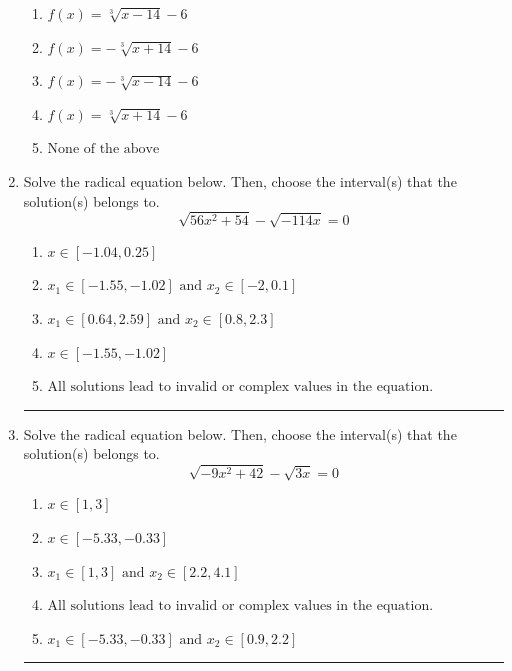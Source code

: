 \documentclass[14pt]{extbook}
\newcommand{\litem}[1]{\item#1\hspace*{-1cm}\rule{\textwidth}{0.4pt}}
\begin{document}
\begin{enumerate}
{\begin{center}
\end{center}
\begin{enumerate}[label=\Alph*.]
\item \( f(x) = \sqrt[3]{x - 14} - 6 \)
\item \( f(x) = - \sqrt[3]{x + 14} - 6 \)
\item \( f(x) = - \sqrt[3]{x - 14} - 6 \)
\item \( f(x) = \sqrt[3]{x + 14} - 6 \)
\item \( \text{None of the above} \)

\end{enumerate} }
\litem{
Solve the radical equation below. Then, choose the interval(s) that the solution(s) belongs to.\[ \sqrt{56 x^2 + 54} - \sqrt{-114 x} = 0 \]\begin{enumerate}[label=\Alph*.]
\item \( x \in [-1.04,0.25] \)
\item \( x_1 \in [-1.55, -1.02] \text{ and } x_2 \in [-2,0.1] \)
\item \( x_1 \in [0.64, 2.59] \text{ and } x_2 \in [0.8,2.3] \)
\item \( x \in [-1.55,-1.02] \)
\item \( \text{All solutions lead to invalid or complex values in the equation.} \)

\end{enumerate} }
\litem{
Solve the radical equation below. Then, choose the interval(s) that the solution(s) belongs to.\[ \sqrt{-9 x^2 + 42} - \sqrt{3 x} = 0 \]\begin{enumerate}[label=\Alph*.]
\item \( x \in [1,3] \)
\item \( x \in [-5.33,-0.33] \)
\item \( x_1 \in [1, 3] \text{ and } x_2 \in [2.2,4.1] \)
\item \( \text{All solutions lead to invalid or complex values in the equation.} \)
\item \( x_1 \in [-5.33, -0.33] \text{ and } x_2 \in [0.9,2.2] \)

\end{enumerate} }
\end{enumerate}
\end{document}

